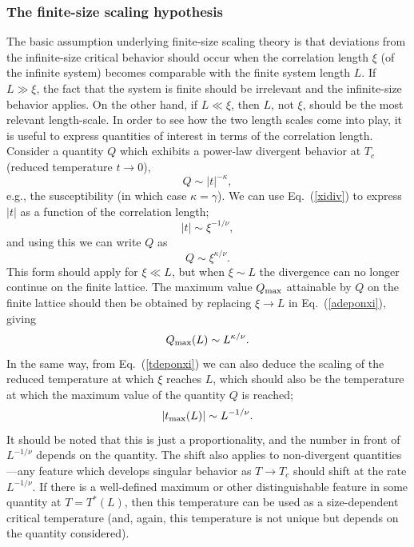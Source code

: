 \documentclass[draft,numberedheadings]{aipproc}
\begin{document}
\subsubsection{The finite-size scaling hypothesis}
\label{finitsizescaling}

The basic assumption underlying finite-size scaling theory \cite{fisher72} is that deviations from the infinite-size critical behavior should occur 
when the correlation length 
$\xi$ (of the infinite system) becomes comparable with the finite system length $L$. If $L \gg \xi$, the fact that the system is finite should be irrelevant and 
the infinite-size behavior applies. On the other hand, if $L \ll \xi$, then $L$, not $\xi$, should be the most relevant length-scale. In order to see how the two 
length scales come into play, it is useful to express quantities of interest in terms of the correlation length. Consider a quantity $Q$ which exhibits a 
power-law divergent behavior at $T_c$ (reduced temperature $t \to 0$),
\begin{equation}
Q \sim |t|^{-\kappa},
\label{adepont}
\end{equation}
e.g., the susceptibility (in which case $\kappa=\gamma$). We can use Eq.~(\ref{xidiv}) to express $|t|$ as a function of the 
correlation length; 
\begin{equation}
|t| \sim {\xi}^{-1/\nu},
\label{tdeponxi}
\end{equation}
and using this we can write $Q$ as
\begin{equation}
Q \sim {\xi}^{\kappa/\nu}.
\label{adeponxi}
\end{equation}
This form should apply for $\xi \ll L$, but when $\xi \sim L$ the divergence can no longer continue on the finite lattice. The maximum value $Q_{\rm max}$ 
attainable by $Q$ on the finite lattice should then be obtained by replacing $\xi \to L$ in Eq.~(\ref{adeponxi}), giving
\begin{equation}
Q_{\rm max}(L) \sim {L}^{\kappa/\nu}.
\label{amaxl}
\end{equation}
In the same way, from Eq.~(\ref{tdeponxi}) we can also deduce the scaling of the reduced temperature at which $\xi$ reaches $L$, which should also be the 
temperature at which the maximum value of the quantity $Q$ is reached;
\begin{equation}
|t_{\rm max}(L)| \sim L^{-1/\nu}.
\label{tmaxl}
\end{equation}
It should be noted that this is just a proportionality, and the number in front of $L^{-1/\nu}$ depends on the quantity. 
The shift also applies to non-divergent quantities---any feature which develops singular behavior as $T \to T_c$ should shift at the rate $L^{-1/\nu}$. If there 
is a well-defined maximum or other distinguishable feature in some quantity at $T=T^*(L)$, then this temperature can be used as a size-dependent critical 
temperature (and, again, this temperature is not unique but depends on the quantity considered).
\end{document}
